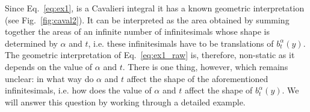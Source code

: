 \documentclass{article}
\theoremstyle{theorem}
\theoremstyle{definition}
\begin{document}
\noindent
Since Eq.~\eqref{eq:ex1}, is a Cavalieri integral it has a known geometric interpretation (see Fig.~\ref{fig:caval2}). It can be interpreted as the area obtained by summing together the areas of an infinite 
number of infinitesimals whose shape is determined by $\alpha$ and $t$, i.e. these infinitesimals have to be translations of $b_t^{\alpha}(y)$. The geometric interpretation of Eq.~\eqref{eq:ex1_raw} is, therefore, non-static as it depends on the value of $\alpha$ and $t$. 
There is one thing, however, which remains unclear: in what way do $\alpha$ and $t$ affect the shape of the aforementioned infinitesimals, i.e. how does the value of $\alpha$ and $t$ affect the shape of $b_t^{\alpha}(y)$. 
We will answer this question by working through a detailed example.\\

\end{document}
